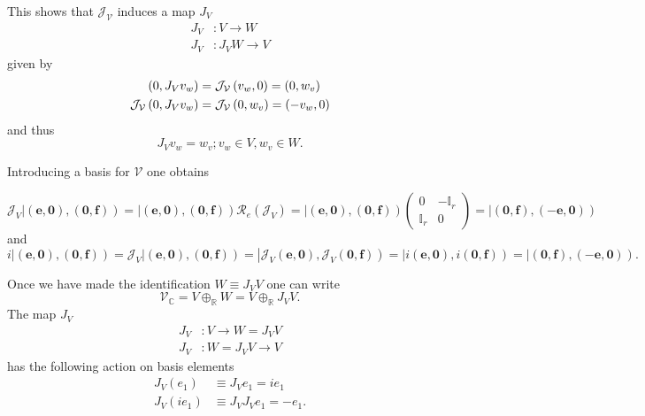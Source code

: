 \documentclass[aps,preprint]{revtex4}
\begin{document}
This shows that $\mathcal{J}_{\mathcal{V}}$ induces a map $J_{V}$ 
\begin{align}
J_{V} & :V\rightarrow W \\
J_{V} & :J_{V}W\rightarrow V
\end{align}
given by 
\begin{align}
\left( 0,J_{V}v_{w}\right) & =\mathcal{J}_{\mathcal{V}}\left( v_{w},0\right)
=\left( 0,w_{v}\right) \\
\mathcal{J}_{\mathcal{V}}\left( 0,J_{V}v_{w}\right) & =\mathcal{J}_{\mathcal{%
V}}\left( 0,w_{v}\right) =\left( -v_{w},0\right)
\end{align}
and thus 
\begin{equation}
J_{V}v_{w}=w_{v};v_{w}\in V,w_{v}\in W.
\end{equation}

Introducing a basis for $\mathcal{V}$ one obtains

\begin{equation*}
\mathcal{J}_{V}\left\vert \left( \mathbf{e,0}\right) \mathbf{,}\left( 
\mathbf{0},\mathbf{f}\right) \right) =\left\vert \left( \mathbf{e,0}\right) 
\mathbf{,}\left( \mathbf{0},\mathbf{f}\right) \right) \mathcal{R}_{e}\left( 
\mathcal{J}_{V}\right) =\left\vert \left( \mathbf{e,0}\right) \mathbf{,}%
\left( \mathbf{0},\mathbf{f}\right) \right) \left( 
\begin{array}{cc}
0 & -\mathbb{I}_{r} \\ 
\mathbb{I}_{r} & 0%
\end{array}
\right) =\left\vert \left( \mathbf{0},\mathbf{f}\right) ,\left( -\mathbf{e,0}%
\right) \right)
\end{equation*}
and 
\begin{equation*}
i\left\vert \left( \mathbf{e,0}\right) \mathbf{,}\left( \mathbf{0},\mathbf{f}%
\right) \right) =\mathcal{J}_{V}\left\vert \left( \mathbf{e,0}\right) 
\mathbf{,}\left( \mathbf{0},\mathbf{f}\right) \right) =\left\vert \mathcal{J}%
_{V}\left( \mathbf{e,0}\right) \mathbf{,}\mathcal{J}_{V}\left( \mathbf{0},%
\mathbf{f}\right) \right) =\left\vert i\left( \mathbf{e,0}\right) \mathbf{,}%
i\left( \mathbf{0},\mathbf{f}\right) \right) =\left\vert \left( \mathbf{0},%
\mathbf{f}\right) ,\left( -\mathbf{e,0}\right) \right) .
\end{equation*}

Once we have made the identification $W\equiv J_{V}V$ one can write 
\begin{equation}
\mathcal{V}_{\mathbb{C}}=V\oplus_{\mathbb{R}}W=V\oplus_{\mathbb{R}}J_{V}V.
\end{equation}
The map $J_{V}$%
\begin{align}
J_{V} & :V\rightarrow W=J_{V}V \\
J_{V} & :W=J_{V}V\rightarrow V
\end{align}
has the following action on basis elements 
\begin{align}
J_{V}\left( e_{1}\right) & \equiv J_{V}e_{1}=ie_{1} \\
J_{V}\left( ie_{1}\right) & \equiv J_{V}J_{V}e_{1}=-e_{1}.
\end{align}
\end{document}
